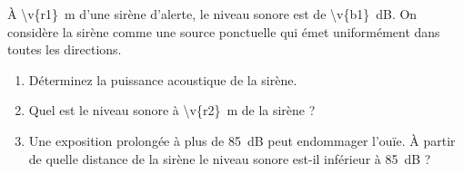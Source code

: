 À \qty{\v{r1}}{m} d'une sirène d'alerte, le niveau sonore est de \qty{\v{b1}}{dB}. On considère la sirène comme une source ponctuelle qui émet uniformément dans toutes les directions.

\begin{enumerate}[label=\alph*)]
    \item Déterminez la puissance acoustique de la sirène.
    \item Quel est le niveau sonore à \qty{\v{r2}}{m} de la sirène ?
    \item Une exposition prolongée à plus de \qty{85}{dB} peut endommager l'ouïe. À partir de quelle distance de la sirène le niveau sonore est-il inférieur à \qty{85}{dB} ?
\end{enumerate}
